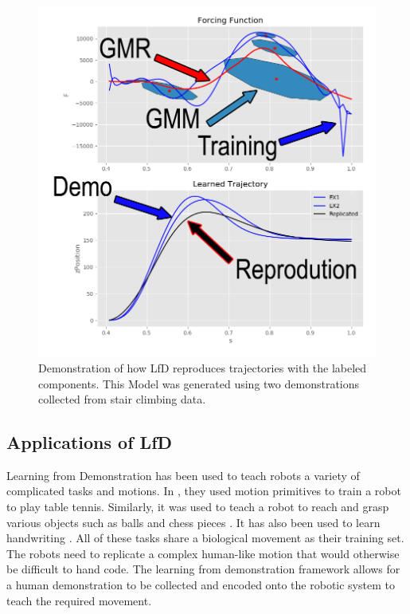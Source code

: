  \begin{figure}
     \centering
     \includegraphics[scale=0.42]{images/background/GMM_reproduction.png}
     \caption[Simple Reproduction Example]{Demonstration of how LfD reproduces trajectories with the labeled components. This Model was generated using two demonstrations collected from stair climbing data. }
     \label{fig:SimpleGMMExample}
 \end{figure}

\subsection{Applications of LfD}
\label{sec:applfd}
Learning from Demonstration has been used to teach robots a variety of complicated tasks and motions. In \cite{mulling2013learning}, they used motion primitives to train a robot to play table tennis. Similarly, it was used to teach a robot to reach and grasp various objects such as balls and chess pieces \cite{calinon2007active}  \cite{hersch2008dynamical}. It has also been used to learn handwriting \cite{kulvicius2011joining}. All of these tasks share a biological movement as their training set. The robots need to replicate a complex human-like motion that would otherwise be difficult to hand code. The learning from demonstration framework allows for a human demonstration to be collected and encoded onto the robotic system to teach the required movement.  

